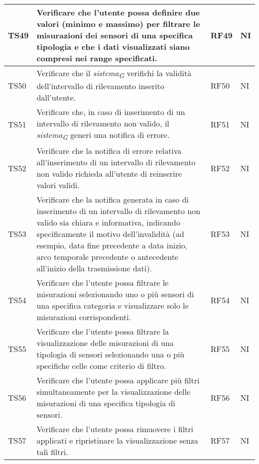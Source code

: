 \begin{longtable}{|C{1.9cm}|L{5cm}|C{2cm}|C{2cm}|}
    TS49 & Verificare che l'utente possa definire due valori (minimo e massimo) per filtrare le misurazioni dei sensori di una specifica tipologia e che i dati visualizzati siano compresi nei range specificati. & RF49 & NI \\
    \hline

    TS50 & Verificare che il \textit{sistema}\textsubscript{\textit{G}} verifichi la validità dell'intervallo di rilevamento inserito dall'utente. & RF50 & NI \\
    \hline

    TS51 & Verificare che, in caso di inserimento di un intervallo di rilevamento non valido, il \textit{sistema}\textsubscript{\textit{G}} generi una notifica di errore. & RF51 & NI \\
    \hline

    TS52 & Verificare che la notifica di errore relativa all'inserimento di un intervallo di rilevamento non valido richieda all'utente di reinserire valori validi. & RF52 & NI \\
    \hline

    TS53 & Verificare che la notifica generata in caso di inserimento di un intervallo di rilevamento non valido sia chiara e informativa, indicando specificamente il motivo dell'invalidità (ad esempio, data fine precedente a data inizio, arco temporale precedente o antecedente all’inizio della trasmissione dati). & RF53 & NI \\
    \hline

    TS54 & Verificare che l'utente possa filtrare le misurazioni selezionando uno o più sensori di una specifica categoria e visualizzare solo le misurazioni corrispondenti. & RF54 & NI \\
    \hline

    TS55 & Verificare che l'utente possa filtrare la visualizzazione delle misurazioni di una tipologia di sensori selezionando una o più specifiche celle come criterio di filtro. & RF55 & NI \\
    \hline

    TS56 & Verificare che l'utente possa applicare più filtri simultaneamente per la visualizzazione delle misurazioni di una specifica tipologia di sensori. & RF56 & NI \\
    \hline

    TS57 & Verificare che l'utente possa rimuovere i filtri applicati e ripristinare la visualizzazione senza tali filtri. & RF57 & NI \\
    \hline


\end{longtable}
